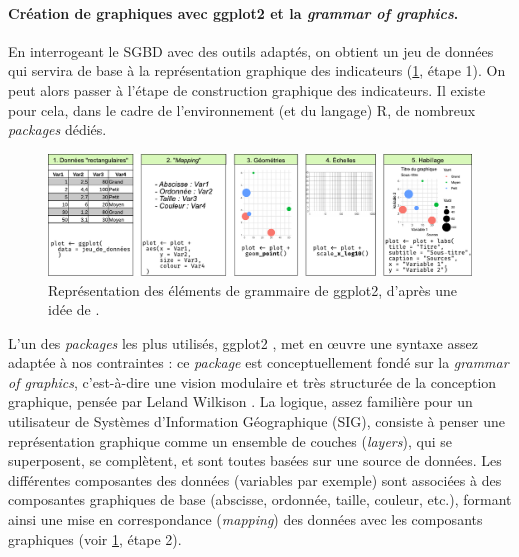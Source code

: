 \paragraph{Création de graphiques avec \textsf{ggplot2} et la \og \textit{grammar of graphics}\fg{}.}

En interrogeant le SGBD avec des outils adaptés, on obtient un jeu de données qui servira de base à la représentation graphique des indicateurs (\cref{fig:socviz-ggplot2}, étape 1).
On peut alors passer à l'étape de construction graphique des indicateurs.
Il existe pour cela, dans le cadre de l'environnement (et du langage) \textsf{R}, de nombreux \textit{packages} dédiés.

\begin{figure}[H]
	\centering
	\captionsetup{width=0.9\linewidth}
	\includegraphics[width=\linewidth]{img/grammar-graphics-steps.pdf}
	\caption[Les éléments de grammaire de \textsf{ggplot2}.]{Représentation des éléments de grammaire de \textsf{ggplot2}, d'après une idée de \textcite{healy_data_2018}.
	}
	\label{fig:socviz-ggplot2}
\end{figure}

L'un des \textit{packages} les plus utilisés, \textsf{ggplot2} \autocite{wickham_ggplot2_2016}, met en œuvre une syntaxe assez adaptée à nos contraintes : ce \textit{package} est conceptuellement fondé sur la \og \textit{grammar of graphics}\fg{}, c'est-à-dire une vision modulaire et très structurée de la conception graphique, pensée par Leland Wilkison \autocite{wilkinson_grammar_2006}.
La logique, assez familière pour un utilisateur de Systèmes d'Information Géographique (SIG), consiste à penser une représentation graphique comme un ensemble de couches (\textit{layers}), qui se superposent, se complètent, et sont toutes basées sur une source de données.
Les différentes composantes des données (variables par exemple) sont associées à des composantes graphiques de base (abscisse, ordonnée, taille, couleur, etc.), formant ainsi une mise en correspondance (\textit{mapping}) des données avec les composants graphiques (voir \cref{fig:socviz-ggplot2}, étape 2).

